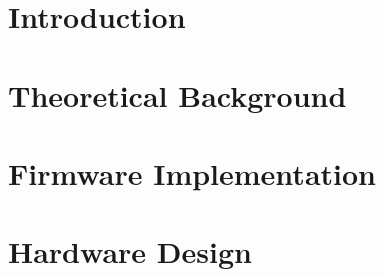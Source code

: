 \documentclass[twoside]{ctuthesis}
\begin{document}
\maketitle %




\part{Introduction}




\part{Theoretical Background}







\part{Firmware Implementation}






\part{Hardware Design}





 
\appendix %

\printbibliography

\end{document}
